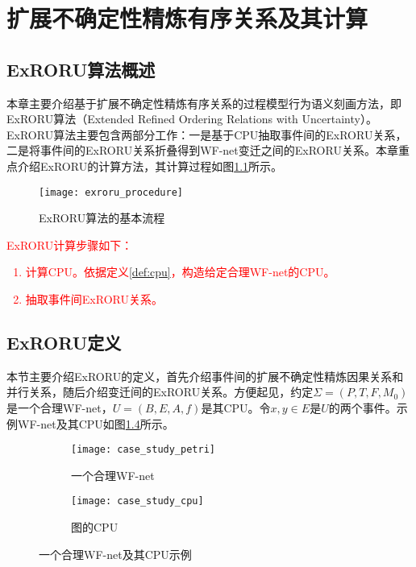 \chapter{扩展不确定性精炼有序关系及其计算}\label{cha:exroru}
\section{ExRORU算法概述}\label{sec:exroru_intro}
本章主要介绍基于扩展不确定性精炼有序关系的过程模型行为语义刻画方法，即ExRORU算法（Extended Refined Ordering Relations with Uncertainty）。ExRORU算法主要包含两部分工作：一是基于CPU抽取事件间的ExRORU关系，二是将事件间的ExRORU关系折叠得到WF-net变迁之间的ExRORU关系。本章重点介绍ExRORU的计算方法，其计算过程如图\ref{fig:exroru_procedure}所示。

\begin{figure}[htbp]
  \centering
  \texttt{[image: exroru\_procedure]}
  \caption{ExRORU算法的基本流程\label{fig:exroru_procedure}}
\end{figure}

\textcolor{red}{
ExRORU计算步骤如下：
\begin{enumerate}[1.]
  \item 计算CPU。依据定义\ref{def:cpu}，构造给定合理WF-net的CPU。
  \item 抽取事件间ExRORU关系。
\end{enumerate}
}

\section{ExRORU定义}\label{sec:exroru_definition}
本节主要介绍ExRORU的定义，首先介绍事件间的扩展不确定性精炼因果关系和并行关系，随后介绍变迁间的ExRORU关系。方便起见，约定$\Sigma=(P,T,F,M_{0})$是一个合理WF-net，$U=(B,E,A,f)$是其CPU。令$x,y\in E$是$U$的两个事件。示例WF-net及其CPU如图\ref{fig:case_study}所示。

\begin{figure}[htbp]
  \centering
  \begin{subfigure}{1\textwidth}
  	\centering
  	\texttt{[image: case\_study\_petri]}
  	\caption{一个合理WF-net}
  	\label{fig:case_study_petri}
  \end{subfigure}
  \begin{subfigure}{1\textwidth}
  	\vspace{1em}
  	\centering
  	\texttt{[image: case\_study\_cpu]}
  	\caption{图的CPU}
  	\label{fig:case_study_cpu}
  \end{subfigure}
  \caption{一个合理WF-net及其CPU示例}
  \label{fig:case_study}
\end{figure}

